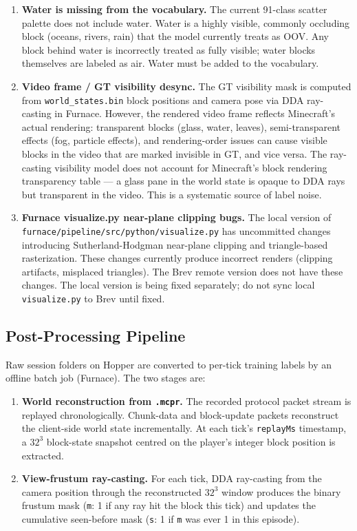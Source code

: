 \documentclass[11pt,a4paper]{article}
\begin{document}
\begin{enumerate}
  \item \textbf{Water is missing from the vocabulary.} The current 91-class scatter palette does not include water. Water is a highly visible, commonly occluding block (oceans, rivers, rain) that the model currently treats as OOV. Any block behind water is incorrectly treated as fully visible; water blocks themselves are labeled as air. Water must be added to the vocabulary.

  \item \textbf{Video frame / GT visibility desync.} The GT visibility mask is computed from \texttt{world\_states.bin} block positions and camera pose via DDA ray-casting in Furnace. However, the rendered video frame reflects Minecraft's actual rendering: transparent blocks (glass, water, leaves), semi-transparent effects (fog, particle effects), and rendering-order issues can cause visible blocks in the video that are marked invisible in GT, and vice versa. The ray-casting visibility model does not account for Minecraft's block rendering transparency table --- a glass pane in the world state is opaque to DDA rays but transparent in the video. This is a systematic source of label noise.

  \item \textbf{Furnace visualize.py near-plane clipping bugs.} The local version of \texttt{furnace/pipeline/src/python/visualize.py} has uncommitted changes introducing Sutherland-Hodgman near-plane clipping and triangle-based rasterization. These changes currently produce incorrect renders (clipping artifacts, misplaced triangles). The Brev remote version does not have these changes. The local version is being fixed separately; do not sync local \texttt{visualize.py} to Brev until fixed.
\end{enumerate}

\subsection{Post-Processing Pipeline}
\label{sec:postproc}

Raw session folders on Hopper are converted to per-tick training labels by an offline batch job (Furnace). The two stages are:

\begin{enumerate}
  \item \textbf{World reconstruction from \texttt{.mcpr}.} The recorded protocol packet stream is replayed chronologically. Chunk-data and block-update packets reconstruct the client-side world state incrementally. At each tick's \texttt{replayMs} timestamp, a $32^3$ block-state snapshot centred on the player's integer block position is extracted.

  \item \textbf{View-frustum ray-casting.} For each tick, DDA ray-casting from the camera position through the reconstructed $32^3$ window produces the binary frustum mask (\texttt{m}: 1 if any ray hit the block this tick) and updates the cumulative seen-before mask (\texttt{s}: 1 if \texttt{m} was ever 1 in this episode).
\end{enumerate}
\end{document}
